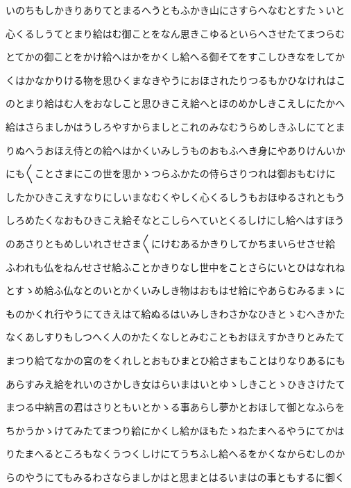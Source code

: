 \documentclass[a4paper,11pt,landscape]{ltjtarticle}
\begin{document}
\par\medskip
いのちもしかきりありてとまるへうともふかき山にさすらへなむとすたゝいと
\par\medskip
心くるしうてとまり給はむ御ことをなん思きこゆるといらへさせたてまつらむ
\par\medskip
とてかの御ことをかけ給へはかをかくし給へる御そてをすこしひきなをしてか
\par\medskip
くはかなかりける物を思ひくまなきやうにおほされたりつるもかひなけれはこ
\par\medskip
のとまり給はむ人をおなしこと思ひきこえ給へとほのめかしきこえしにたかへ
\par\medskip
給はさらましかはうしろやすからましとこれのみなむうらめしきふしにてとま
\par\medskip
りぬへうおほえ侍との給へはかくいみしうものおもふへき身にやありけんいか
\par\medskip
にも〱ことさまにこの世を思かゝつらふかたの侍らさりつれは御おもむけに
\par\medskip
したかひきこえすなりにしいまなむくやしく心くるしうもおほゆるされともう
\par\medskip
しろめたくなおもひきこえ給そなとこしらへていとくるしけにし給へはすほう
\par\medskip
のあさりともめしいれさせさま〱にけむあるかきりしてかちまいらせさせ給
\par\medskip
ふわれも仏をねんせさせ給ふことかきりなし世中をことさらにいとひはなれね
\par\medskip
とすゝめ給ふ仏なとのいとかくいみしき物はおもはせ給にやあらむみるまゝに
\par\medskip
ものかくれ行やうにてきえはて給ぬるはいみしきわさかなひきとゝむへきかた
\par\medskip
なくあしすりもしつへく人のかたくなしとみむこともおほえすかきりとみたて
\par\medskip
まつり給てなかの宮のをくれしとおもひまとひ給さまもことはりなりあるにも
\par\medskip
あらすみえ給をれいのさかしき女はらいまはいとゆゝしきことゝひきさけたて
\par\medskip
まつる中納言の君はさりともいとかゝる事あらし夢かとおほして御となふらを
\par\medskip
ちかうかゝけてみたてまつり給にかくし給かほもたゝねたまへるやうにてかは
\par\medskip
りたまへるところもなくうつくしけにてうちふし給へるをかくなからむしのか
\par\medskip
らのやうにてもみるわさならましかはと思まとはるいまはの事ともするに御く
\end{document}
